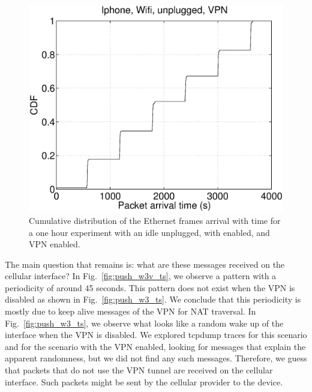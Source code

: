 \begin{figure}
\centering
        \includegraphics[width=0.8\linewidth]{../../code/pushNotification/Fig/bw_iphone_wifi_unplug_vpn_ts.eps}
  \caption{Cumulative distribution of the Ethernet frames
          arrival with time for a one hour experiment with an idle
          \iphone{} unplugged, with \wifi{} enabled, and VPN
          enabled.}
  \label{fig:push_wv_ts}
   \vspace{\postfigspace}
\end{figure}


The main question that remains is: what are these messages received on
the cellular interface? In Fig.~\ref{fig:push_w3v_ts}, we observe a pattern
with a periodicity of around 45 seconds. This pattern does not exist
when the VPN is disabled as shown in Fig.~\ref{fig:push_w3_ts}. We
conclude that this periodicity is mostly due to keep alive messages of the
VPN for NAT traversal. In Fig.~\ref{fig:push_w3_ts}, we observe what looks like
a random wake up of the \wifi interface when the VPN is disabled. We
explored tcpdump traces for this scenario and for the scenario with
the VPN enabled, looking for messages that explain the apparent
randomness, but we did not find any such messages. Therefore, we guess
that packets that do not use the VPN tunnel are received on the cellular 
interface. Such packets might be sent by the cellular provider to the
device. 

 

